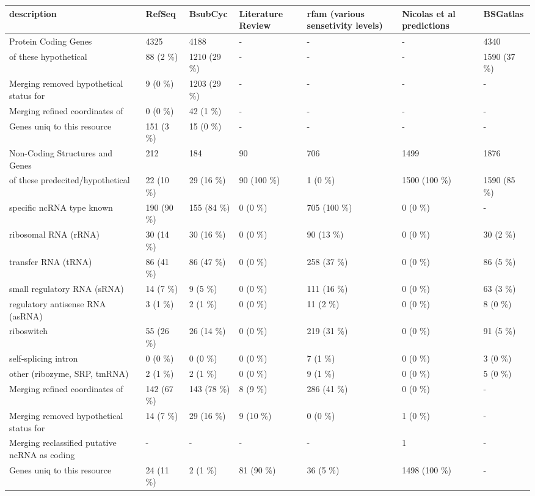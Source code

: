 \centering
\begin{tabular}{lllllll}
\toprule
description & RefSeq & BsubCyc & Literature Review & rfam (various sensetivity levels) & Nicolas et al predictions & BSGatlas\\
\midrule
Protein Coding Genes & 4325 & 4188 & - & - & - & 4340\\
\hspace{1em}of these hypothetical & 88 (2 \%) & 1210 (29 \%) & - & - & - & 1590 (37 \%)\\
Merging removed hypothetical status for & 9 (0 \%) & 1203 (29 \%) & - & - & - & -\\
Merging refined coordinates of & 0 (0 \%) & 42 (1 \%) & - & - & - & -\\
Genes uniq to this resource & 151 (3 \%) & 15 (0 \%) & - & - & - & -\\
\hline
Non-Coding Structures and Genes & 212 & 184 & 90 & 706 & 1499 & 1876\\
\hspace{1em}of these predecited/hypothetical & 22 (10 \%) & 29 (16 \%) & 90 (100 \%) & 1 (0 \%) & 1500 (100 \%) & 1590 (85 \%)\\
specific ncRNA type known & 190 (90 \%) & 155 (84 \%) & 0 (0 \%) & 705 (100 \%) & 0 (0 \%) & -\\
\hspace{1em}ribosomal RNA (rRNA) & 30 (14 \%) & 30 (16 \%) & 0 (0 \%) & 90 (13 \%) & 0 (0 \%) & 30 (2 \%)\\
\hspace{1em}transfer RNA (tRNA) & 86 (41 \%) & 86 (47 \%) & 0 (0 \%) & 258 (37 \%) & 0 (0 \%) & 86 (5 \%)\\
\hspace{1em}small regulatory RNA (sRNA) & 14 (7 \%) & 9 (5 \%) & 0 (0 \%) & 111 (16 \%) & 0 (0 \%) & 63 (3 \%)\\
\hspace{1em}regulatory antisense RNA (asRNA) & 3 (1 \%) & 2 (1 \%) & 0 (0 \%) & 11 (2 \%) & 0 (0 \%) & 8 (0 \%)\\
\hspace{1em}riboswitch & 55 (26 \%) & 26 (14 \%) & 0 (0 \%) & 219 (31 \%) & 0 (0 \%) & 91 (5 \%)\\
\hspace{1em}self-splicing intron & 0 (0 \%) & 0 (0 \%) & 0 (0 \%) & 7 (1 \%) & 0 (0 \%) & 3 (0 \%)\\
\hspace{1em}other (ribozyme, SRP, tmRNA) & 2 (1 \%) & 2 (1 \%) & 0 (0 \%) & 9 (1 \%) & 0 (0 \%) & 5 (0 \%)\\
Merging refined coordinates of & 142 (67 \%) & 143 (78 \%) & 8 (9 \%) & 286 (41 \%) & 0 (0 \%) & -\\
Merging removed hypothetical status for & 14 (7 \%) & 29 (16 \%) & 9 (10 \%) & 0 (0 \%) & 1 (0 \%) & -\\
Merging reclassified putative ncRNA as coding & - & - & - & - & 1 & -\\
Genes uniq to this resource & 24 (11 \%) & 2 (1 \%) & 81 (90 \%) & 36 (5 \%) & 1498 (100 \%) & -\\
\bottomrule
\end{tabular}
